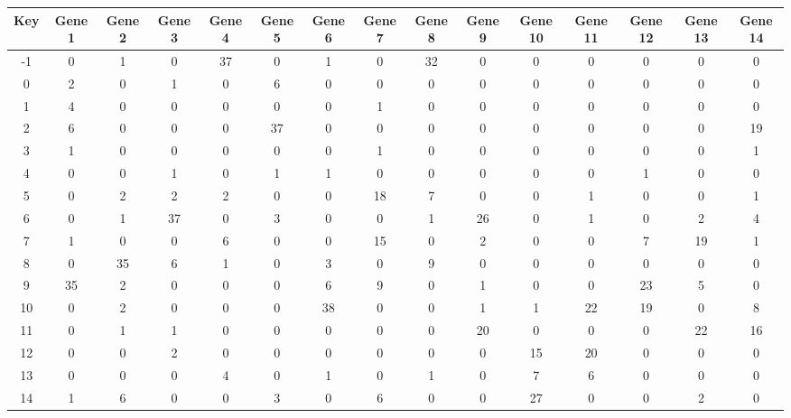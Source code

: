 \begin{tabular}{|c|c|c|c|c|c|c|c|c|c|c|c|c|c|c|}
\hline
Key & Gene 1 & Gene 2 & Gene 3 & Gene 4 & Gene 5 & Gene 6 & Gene 7 & Gene 8 & Gene 9 & Gene 10 & Gene 11 & Gene 12 & Gene 13 & Gene 14 \\
\hline
-1 & 0 & 1 & 0 & 37 & 0 & 1 & 0 & 32 & 0 & 0 & 0 & 0 & 0 & 0 \\
0 & 2 & 0 & 1 & 0 & 6 & 0 & 0 & 0 & 0 & 0 & 0 & 0 & 0 & 0 \\
1 & 4 & 0 & 0 & 0 & 0 & 0 & 1 & 0 & 0 & 0 & 0 & 0 & 0 & 0 \\
2 & 6 & 0 & 0 & 0 & 37 & 0 & 0 & 0 & 0 & 0 & 0 & 0 & 0 & 19 \\
3 & 1 & 0 & 0 & 0 & 0 & 0 & 1 & 0 & 0 & 0 & 0 & 0 & 0 & 1 \\
4 & 0 & 0 & 1 & 0 & 1 & 1 & 0 & 0 & 0 & 0 & 0 & 1 & 0 & 0 \\
5 & 0 & 2 & 2 & 2 & 0 & 0 & 18 & 7 & 0 & 0 & 1 & 0 & 0 & 1 \\
6 & 0 & 1 & 37 & 0 & 3 & 0 & 0 & 1 & 26 & 0 & 1 & 0 & 2 & 4 \\
7 & 1 & 0 & 0 & 6 & 0 & 0 & 15 & 0 & 2 & 0 & 0 & 7 & 19 & 1 \\
8 & 0 & 35 & 6 & 1 & 0 & 3 & 0 & 9 & 0 & 0 & 0 & 0 & 0 & 0 \\
9 & 35 & 2 & 0 & 0 & 0 & 6 & 9 & 0 & 1 & 0 & 0 & 23 & 5 & 0 \\
10 & 0 & 2 & 0 & 0 & 0 & 38 & 0 & 0 & 1 & 1 & 22 & 19 & 0 & 8 \\
11 & 0 & 1 & 1 & 0 & 0 & 0 & 0 & 0 & 20 & 0 & 0 & 0 & 22 & 16 \\
12 & 0 & 0 & 2 & 0 & 0 & 0 & 0 & 0 & 0 & 15 & 20 & 0 & 0 & 0 \\
13 & 0 & 0 & 0 & 4 & 0 & 1 & 0 & 1 & 0 & 7 & 6 & 0 & 0 & 0 \\
14 & 1 & 6 & 0 & 0 & 3 & 0 & 6 & 0 & 0 & 27 & 0 & 0 & 2 & 0 \\
\hline
\end{tabular}